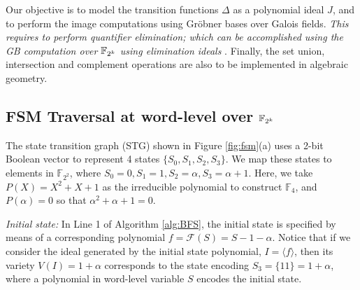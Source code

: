 
Our objective is to model the transition functions $\Delta$ as a
polynomial ideal $J$, and to perform the image computations 
using Gr\"obner bases over Galois fields. {\it
This requires to perform quantifier elimination; which can be
accomplished using the GB computation over ${\mathbb{F}}_{2^k}$ using elimination
ideals} \cite{gao:qe-gf-gb}. Finally, the set union, intersection and
complement operations are also to be implemented in algebraic geometry.

\subsection{FSM Traversal at word-level over ${\mathbb{F}}_{2^k}$} 
The state transition graph (STG) shown in Figure \ref{fig:fsm}(a) uses a
2-bit Boolean vector to represent 4 states $\{S_0, S_1, S_2,
S_3\}$. We map these states to elements in $\mathbb{F}_{2^2}$, where
$S_0 = 0, S_1 = 1, S_2 = \alpha, S_3 = \alpha+1$. Here, we take 
$P(X) = X^2+X+1$ as the irreducible polynomial to construct
$\mathbb{F}_4$, and $P(\alpha) = 0$ so that $\alpha^2 + \alpha + 1 =
0$.  

{\it Initial state:} In Line 1 of Algorithm \ref{alg:BFS}, the initial state is
specified by means of a corresponding polynomial $f = \mathcal{F}(S) =
S - 1 - \alpha$. Notice that if we consider the ideal generated by the
initial state polynomial, $I = \langle f\rangle$, then its variety
$V(I) = 1+\alpha$ corresponds to the state encoding $S_3 = \{11\} =
1+\alpha$, where a polynomial in word-level variable $S$ encodes the
initial state. 




